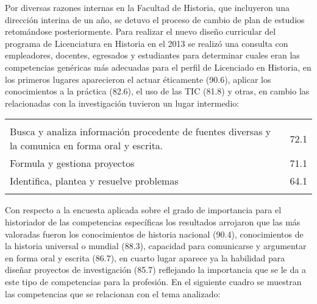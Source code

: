 \medskip
Por diversas razones internas en la Facultad de Historia, que 
incluyeron una dirección interina de un año, se detuvo el proceso de 
cambio de plan de estudios retomándose posteriormente. Para realizar el 
nuevo diseño curricular del programa de Licenciatura en Historia en el 
2013 se realizó una consulta con empleadores, docentes, egresados y 
estudiantes para determinar cuales eran las competencias genéricas más 
adecuadas para el perfil de Licenciado en Historia, en los primeros 
lugares aparecieron el actuar éticamente (90.6), aplicar los 
conocimientos a la práctica (82.6), el uso de las TIC (81.8) y otras, 
en cambio las relacionadas con la investigación tuvieron un lugar 
intermedio:


\bigskip
\begin{footnotesize}
\begin{center}
\tablefirsthead{}
\tablehead{}
\tabletail{}
\tablelasttail{}
\begin{supertabular}{|m{0.744\textwidth}|m{0.163\textwidth}|}
\hline
{}\\\hline
{} & {}\\\hline
Busca y analiza información procedente de fuentes diversas y la comunica en
forma oral y escrita. &
{\hfil 72.1}\\\hline
Formula y gestiona proyectos &
{\hfil 71.1}\\\hline
Identifica, plantea y resuelve problemas &
{\hfil 64.1}\\\hline\hline
{}\\\hline
\end{supertabular}
\end{center}
\end{footnotesize}

\bigskip
Con respecto a la encuesta aplicada sobre el grado de importancia para 
el historiador de las competencias específicas los resultados arrojaron 
que las más valoradas fueron los conocimientos de historia nacional 
(90.4), conocimientos de la historia universal o mundial (88.3), 
capacidad para comunicarse y argumentar en forma oral y escrita (86.7), 
en cuarto lugar aparece ya la habilidad para diseñar proyectos de 
investigación (85.7) reflejando la importancia que se le da a este tipo 
de competencias para la profesión. En el siguiente cuadro se muestran 
las competencias que se relacionan con el tema analizado:
\newpage


